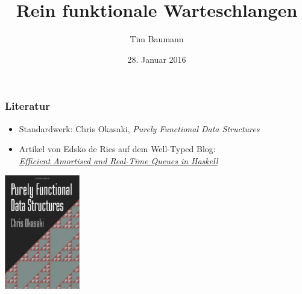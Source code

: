 \documentclass{beamer}
\title[PFDS]{Rein funktionale Warteschlangen}
\author{Tim Baumann}
\institute[CCA]{Curry Club Augsburg}
\date{28. Januar 2016}
\begin{document}
\begin{frame}
  \titlepage
\end{frame}

\begin{frame}
  \frametitle{Literatur}
  \begin{itemize}
    \item Standardwerk: Chris Okasaki, \textit{Purely Functional Data Structures}
    \item Artikel von Edsko de Ries auf dem Well-Typed Blog: \\
    \href{http://www.well-typed.com/blog/2016/01/efficient-queues/}{\textit{Efficient Amortised and Real-Time Queues in Haskell}}
  \end{itemize}
  \begin{center}
    \includegraphics[height=5cm]{pfds_cover.jpg}
  \end{center}
\end{frame}
\end{document}
